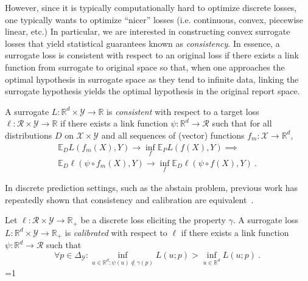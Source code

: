 \documentclass[anon,12pt]{colt2021} %
\newcommand{\Comments}{1}
\newcommand{\mytodo}[2]{\ifnum\Comments=1%
	\todo[linecolor=#1!80!black,backgroundcolor=#1,bordercolor=#1!80!black]{#2}\fi}
\newcommand{\jessiet}[1]{\mytodo{teal!20!white}{JF: #1}}
\newcommand{\reals}{\mathbb{R}}
\newcommand{\simplex}{\Delta_\Y}
\newcommand{\E}{\mathbb{E}}
\newcommand{\R}{\mathcal{R}}
\newcommand{\X}{\mathcal{X}}
\newcommand{\Y}{\mathcal{Y}}
\DeclareMathOperator*{\argmax}{arg\,max}
\begin{document}

However, since it is typically computationally hard to optimize discrete losses, one typically wants to optimize ``nicer'' losses (i.e. continuous, convex, piecewise linear, etc.) 
In particular, we are interested in constructing convex surrogate losses that yield statistical guarantees known as \emph{consistency}.
In essence, a surrogate loss is consistent with respect to an original loss if there exists a link function from surrogate to original space so that, when one approaches the optimal hypothesis in surrogate space as they tend to infinite data, linking the surrogate hypothesis yields the optimal hypothesis in the original report space.

\begin{definition}[Consistent]
	A surrogate $L:\reals^d \times \Y \to \reals$ is \emph{consistent} with respect to a target loss $\ell:\R \times \Y \to \reals$ if there exists a link function $\psi : \reals^d \to \R$ such that for all distributions $D$ on $\X \times\Y$ and all sequences of (vector) functions $f_m : \X \to \reals^d$,
	\begin{multline*}
	\E_D L(f_m(X), Y) \to \inf_f \E_P L(f(X), Y) \implies \\
	\E_D \ell(\psi  \circ f_m(X), Y) \to \inf_f \E_D \ell(\psi \circ f(X), Y)~.~
	\end{multline*}
\end{definition}

In discrete prediction settings, such as the abstain problem, previous work has repeatedly shown that consistency and calibration are equivalent~\citep{zhang2004statistical,bartlett2006convexity,tewari2007consistency,ramaswamy2016convex}.

\begin{definition}[Calibrated]\label{def:calibrated}
	Let $\ell : \R \times \Y \to \reals_+$ be a discrete loss eliciting the property $\gamma$.
A surrogate loss $L : \reals^d \times \Y \to \reals_+$ is \emph{calibrated} with respect to $\ell$ if there exists a link function $\psi: \reals^d \to \R$ such that
\begin{equation}\label{eq:calibration}
\forall p \in \simplex: \inf_{u \in \reals^d : \psi(u) \not \in \gamma(p)} L(u;p) > \inf_{u \in \reals^d} L(u;p)~.~
\end{equation}	
\jessiet{Fix notation $\gamma$}
\end{definition}
\end{document}
